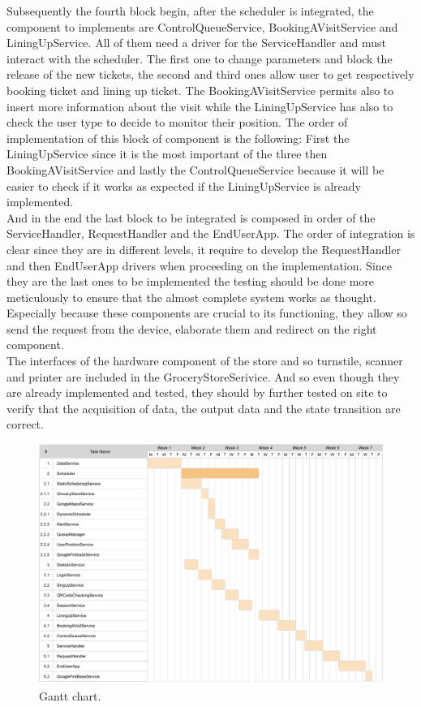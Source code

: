 Subsequently the fourth block begin, after the scheduler is integrated, the component to implements are ControlQueueService, BookingAVisitService and LiningUpService. All of them need a driver for the ServiceHandler and must interact with the scheduler. The first one to change parameters and block the release of the new tickets, the second and third ones allow user to get respectively booking ticket and lining up ticket. The BookingAVisitService permits also to insert more information about the visit while the LiningUpService has also to check the user type to decide to monitor their position. The order of implementation of this block of component is the following: First the LiningUpService since it is the most important of the three then BookingAVisitService and lastly the ControlQueueService because it will be easier to check if it works as expected if the LiningUpService is already implemented. \\
And in the end the last block to be integrated is composed in order of the ServiceHandler, RequestHandler and the EndUserApp. The order of integration is clear since they are in different levels, it require to develop the RequestHandler and then EndUserApp drivers when proceeding on the implementation. 
Since they are the last ones to be implemented the testing should be done more meticulously to ensure that the almost complete system works as thought. Especially because these components are crucial to its functioning, they allow so send the request from the device, elaborate them and redirect on the right component.\\
The interfaces of the hardware component of the store and so turnstile, scanner and printer are included in the GroceryStoreSerivice. And so even though they are already implemented and tested, they should by further tested on site to verify that the acquisition of data, the output data and the state transition are correct. 
\begin{figure}[H]
    \centering
    \includegraphics[width=1.0\textwidth]{images/Gantt.pdf}
    \caption{Gantt chart.}
\end{figure}

